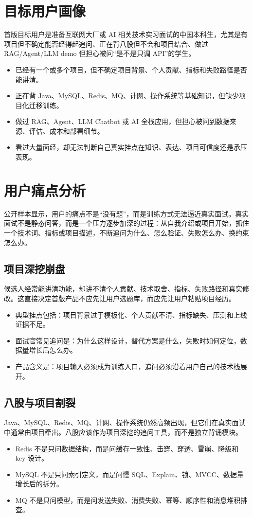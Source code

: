 \documentclass[UTF8,11pt]{ctexart}
\begin{document}
\section{目标用户画像}

首版目标用户是准备互联网大厂或 AI 相关技术实习面试的中国本科生，尤其是有项目但不确定能否经得起追问、正在背八股但不会和项目结合、做过 RAG/Agent/LLM demo 但担心被问“是不是只调 API”的学生。
\begin{itemize}
\item 已经有一个或多个项目，但不确定项目背景、个人贡献、指标和失败路径是否能讲清。
\item 正在背 Java、MySQL、Redis、MQ、计网、操作系统等基础知识，但缺少项目化迁移训练。
\item 做过 RAG、Agent、LLM Chatbot 或 AI 全栈应用，但担心被问到数据来源、评估、成本和部署细节。
\item 看过大量面经，却无法判断自己真实挂点在知识、表达、项目可信度还是承压表现。
\end{itemize}

\section{用户痛点分析}


\FloatBarrier

公开样本显示，用户的痛点不是“没有题”，而是训练方式无法逼近真实面试。真实面试不是静态问答，而是一个压力逐步加深的过程：从自我介绍或项目开始，抓住一个技术词、指标或项目描述，不断追问为什么、怎么验证、失败怎么办、换约束怎么办。

\subsection{项目深挖崩盘}
候选人经常能讲清功能，却讲不清个人贡献、技术取舍、指标、失败路径和真实修改。这直接决定首版产品不应先让用户选题库，而应先让用户粘贴项目经历。
\begin{itemize}
\item 典型挂点包括：项目背景过于模板化、个人贡献不清、指标缺失、压测和上线证据不足。
\item 面试官常见追问是：为什么这样设计，替代方案是什么，失败时如何定位，数据量增长后怎么办。
\item 产品含义是：项目输入必须成为训练入口，追问必须沿着用户自己的技术栈展开。
\end{itemize}

\subsection{八股与项目割裂}
Java、MySQL、Redis、MQ、计网、操作系统仍然高频出现，但它们在真实面试中通常由项目牵出。八股应该作为项目深挖的追问工具，而不是独立背诵模块。
\begin{itemize}
\item Redis 不是只问数据结构，而是问缓存一致性、击穿、穿透、雪崩、降级和 key 设计。
\item MySQL 不是只问索引定义，而是问慢 SQL、Explain、锁、MVCC、数据量增长后的拆分。
\item MQ 不是只问模型，而是问发送失败、消费失败、幂等、顺序性和消息堆积排查。
\end{itemize}
\end{document}
